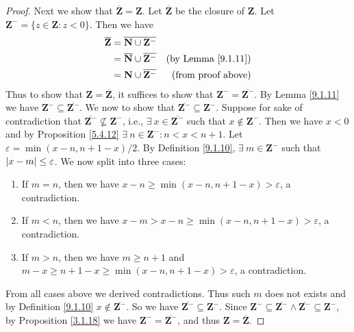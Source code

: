 \begin{proof}
    Next we show that \(\overline{\mathbf{Z}} = \mathbf{Z}\).
    Let \(\overline{\mathbf{Z}}\) be the closure of \(\mathbf{Z}\).
    Let \(\mathbf{Z}^- = \{z \in \mathbf{Z} : z < 0\}\).
    Then we have
    \begin{align*}
        \overline{\mathbf{Z}} & = \overline{\mathbf{N} \cup \mathbf{Z}^-}                                             \\
                              & = \overline{\mathbf{N}} \cup \overline{\mathbf{Z}^-} & \text{(by Lemma \ref{9.1.11})} \\
                              & = \mathbf{N} \cup \overline{\mathbf{Z}^-}            & \text{(from proof above)}
    \end{align*}
    Thus to show that \(\mathbf{Z} = \overline{\mathbf{Z}}\), it suffices to show that \(\mathbf{Z}^- = \overline{\mathbf{Z}^-}\).
    By Lemma \ref{9.1.11} we have \(\mathbf{Z}^- \subseteq \overline{\mathbf{Z}^-}\).
    We now to show that \(\overline{\mathbf{Z}^-} \subseteq \mathbf{Z}^-\).
    Suppose for sake of contradiction that \(\overline{\mathbf{Z}^-} \not\subseteq \mathbf{Z}^-\), i.e., \(\exists\ x \in \overline{\mathbf{Z}^-}\) such that \(x \notin \mathbf{Z}^-\).
    Then we have \(x < 0\) and by Proposition \ref{5.4.12} \(\exists\ n \in \mathbf{Z}^- : n < x < n + 1\).
    Let \(\varepsilon = \min(x - n, n + 1 - x) / 2\).
    By Definition \ref{9.1.10}, \(\exists\ m \in \mathbf{Z}^-\) such that \(\abs*{x - m} \leq \varepsilon\).
    We now split into three cases:
    \begin{enumerate}
        \item If \(m = n\), then we have \(x - n \geq \min(x - n, n + 1 - x) > \varepsilon\), a contradiction.
        \item If \(m < n\), then we have \(x - m > x - n \geq \min(x - n, n + 1 - x) > \varepsilon\), a contradiction.
        \item If \(m > n\), then we have \(m \geq n + 1\) and \(m - x \geq n + 1 - x \geq \min(x - n, n + 1 - x) > \varepsilon\), a contradiction.
    \end{enumerate}
    From all cases above we derived contradictions.
    Thus such \(m\) does not exists and by Definition \ref{9.1.10} \(x \notin \overline{\mathbf{Z}^-}\).
    So we have \(\overline{\mathbf{Z}^-} \subseteq \mathbf{Z}^-\).
    Since \(\mathbf{Z}^- \subseteq \overline{\mathbf{Z}^-} \land \overline{\mathbf{Z}^-} \subseteq \mathbf{Z}^-\), by Proposition \ref{3.1.18} we have \(\mathbf{Z}^- = \overline{\mathbf{Z}^-}\), and thus \(\mathbf{Z} = \overline{\mathbf{Z}}\).


\end{proof}
